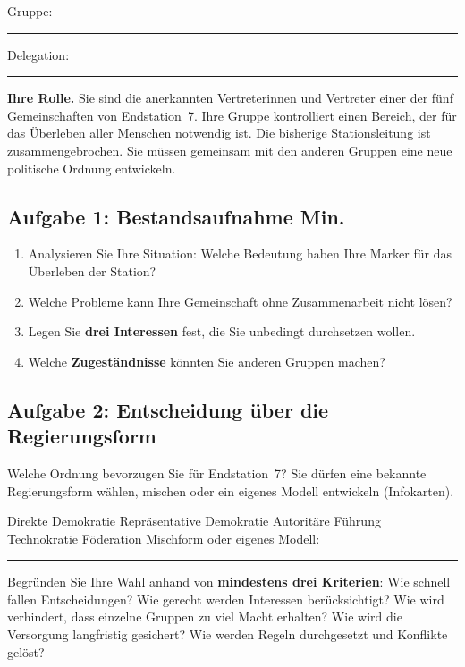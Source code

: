 \clearpage
{}
\noindent Gruppe: \rule{5.5cm}{0.4pt}\hfill Delegation: \rule{5cm}{0.4pt}

\medskip
\noindent\textbf{Ihre Rolle.} Sie sind die anerkannten Vertreterinnen und Vertreter einer der fünf Gemeinschaften von Endstation~7. Ihre Gruppe kontrolliert einen Bereich, der für das Überleben aller Menschen notwendig ist. Die bisherige Stationsleitung ist zusammengebrochen. Sie müssen gemeinsam mit den anderen Gruppen eine neue politische Ordnung entwickeln.

\subsection*{Aufgabe 1: Bestandsaufnahme \hfill \normalsize{}\fi{} Min.}
\begin{enumerate}
  \item Analysieren Sie Ihre Situation: Welche Bedeutung haben Ihre Marker für das Überleben der Station?
  \item Welche Probleme kann Ihre Gemeinschaft ohne Zusammenarbeit nicht lösen?
  \item Legen Sie \textbf{drei Interessen} fest, die Sie unbedingt durchsetzen wollen.
  \item Welche \textbf{Zugeständnisse} könnten Sie anderen Gruppen machen?
\end{enumerate}

\subsection*{Aufgabe 2: Entscheidung über die Regierungsform}
Welche Ordnung bevorzugen Sie für Endstation~7? Sie dürfen eine bekannte Regierungsform wählen, mischen oder ein eigenes Modell entwickeln (Infokarten).

\noindent
\feld Direkte Demokratie \quad \feld Repräsentative Demokratie \quad \feld Autoritäre Führung\\[1mm]
\feld Technokratie \quad \feld Föderation \quad \feld Mischform oder eigenes Modell: \rule{3.8cm}{0.4pt}

\medskip
\noindent Begründen Sie Ihre Wahl anhand von \textbf{mindestens drei Kriterien}: Wie schnell fallen Entscheidungen? Wie gerecht werden Interessen berücksichtigt? Wie wird verhindert, dass einzelne Gruppen zu viel Macht erhalten? Wie wird die Versorgung langfristig gesichert? Wie werden Regeln durchgesetzt und Konflikte gelöst?

